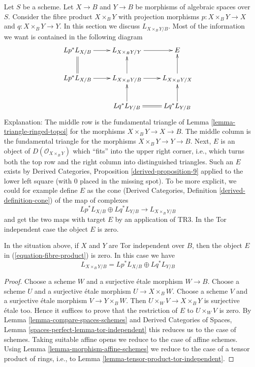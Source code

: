 \noindent
Let $S$ be a scheme. Let $X \to B$ and $Y \to B$ be morphisms of algebraic
spaces over $S$. Consider the fibre product $X \times_B Y$ with projection
morphisms $p : X \times_B Y \to X$ and $q : X \times_B Y \to Y$.
In this section we discuss $L_{X \times_B Y/B}$. Most of the
information we want is contained in the following diagram
\begin{equation}
\label{equation-fibre-product}
\vcenter{
\xymatrix{
Lp^*L_{X/B} \ar[r] &
L_{X \times_B Y/Y} \ar[r] &
E \\
Lp^*L_{X/B} \ar[r] \ar@{=}[u] &
L_{X \times_B Y/B} \ar[r] \ar[u] &
L_{X \times_B Y/X} \ar[u] \\
 &
Lq^*L_{Y/B} \ar[u] \ar@{=}[r] &
Lq^*L_{Y/B} \ar[u]
}
}
\end{equation}
Explanation: The middle row is the fundamental triangle of
Lemma \ref{lemma-triangle-ringed-topoi} for the morphisms
$X \times_B Y \to X \to B$. The middle column is the fundamental triangle
for the morphisms $X \times_B Y \to Y \to B$.
Next, $E$ is an object of $D(\mathcal{O}_{X \times_B Y})$ which ``fits''
into the upper right corner, i.e., which turns both the top row
and the right column into distinguished triangles. Such an $E$
exists by Derived Categories, Proposition \ref{derived-proposition-9}
applied to the lower left square (with $0$ placed in the missing
spot). To be more explicit, we could for example define $E$ as the cone
(Derived Categories, Definition \ref{derived-definition-cone})
of the map of complexes
$$
Lp^*L_{X/B} \oplus Lq^*L_{Y/B} \longrightarrow L_{X \times_B Y/B}
$$
and get the two maps with target $E$ by an application of TR3.
In the Tor independent case the object $E$ is zero.

\begin{lemma}
\label{lemma-fibre-product-tor-independent}
In the situation above, if $X$ and $Y$ are Tor independent over $B$, then
the object $E$ in (\ref{equation-fibre-product}) is zero. In this case we
have
$$
L_{X \times_B Y/B} = Lp^*L_{X/B} \oplus Lq^*L_{Y/B}
$$
\end{lemma}

\begin{proof}
Choose a scheme $W$ and a surjective \'etale morphism $W \to B$.
Choose a scheme $U$ and a surjective \'etale morphism $U \to X \times_B W$.
Choose a scheme $V$ and a surjective \'etale morphism $V \to Y \times_B W$.
Then $U \times_W V \to X \times_B Y$ is surjective \'etale too.
Hence it suffices to prove that the restriction of $E$ to $U \times_W V$
is zero. By Lemma \ref{lemma-compare-spaces-schemes} and
Derived Categories of Spaces, Lemma \ref{spaces-perfect-lemma-tor-independent}
this reduces us to the case of schemes.
Taking suitable affine opens we reduce to the case of affine schemes.
Using 
Lemma \ref{lemma-morphism-affine-schemes}
we reduce to the case of a tensor product of rings, i.e., to
Lemma \ref{lemma-tensor-product-tor-independent}.
\end{proof}

